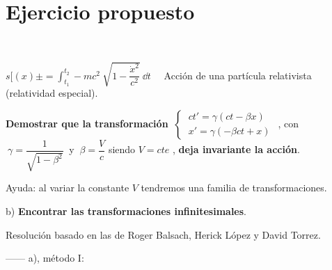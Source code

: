 \vspace{10mm}

\section{Ejercicio propuesto}
\vspace{5mm}
\begin{ejercicio}
\begin{adjustwidth}{20pt}{20pt}

$\,$

$s[(x)±=\displaystyle \int_{t_1}^{t_2} -mc^2 \ \sqrt{1-\dfrac{\dot x^2}{c^2}}\ \dd t\quad $	Acción de una partícula relativista (relatividad especial).
\end{adjustwidth}

\begin{adjustwidth}{30pt}{0pt}
	\textbf{Demostrar que la transformación} $\ \begin{cases} \ ct'=\gamma(ct-\beta x) \\ \ x'=\gamma (-\beta c t + x) \end{cases} \, \  $, con $\ \gamma = \dfrac 1 {\sqrt{1-\beta^2}} \ $  y $\ \beta=\dfrac V c $ siendo $V=cte$  , \textbf{deja invariante la acción}.

Ayuda: al variar la constante $V$ tendremos una familia de transformaciones.
\end{adjustwidth}

\begin{adjustwidth}{30pt}{0pt}
b) 	\textbf{Encontrar las transformaciones infinitesimales}.

\vspace{2mm}
\end{adjustwidth}

\end{ejercicio}

\vspace{5mm}

\color{MidnightBlue}

\vspace{-10mm}
\begin{flushright}\begin{footnotesize}
Resolución basado en las de Roger Balsach, Herick López y David Torrez.
\end{footnotesize}\end{flushright}

\vspace{5mm}

------ a), método I:

